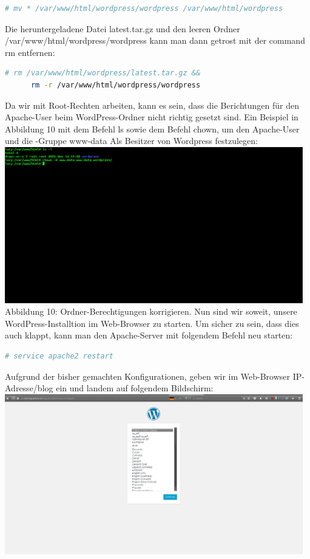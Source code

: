 \documentclass{article}
\begin{document}
	\begin{lstlisting}[language=bash]
	# mv * /var/www/html/wordpress/wordpress /var/www/html/wordpress
	\end{lstlisting}
	Die heruntergeladene Datei latest.tar.gz und den leeren Ordner /var/www/html/wordpress/wordpress kann man dann getrost mit der command rm entfernen:
	\begin{lstlisting}[language=bash]
	# rm /var/www/html/wordpress/latest.tar.gz &&
	  rm -r /var/www/html/wordpress/wordpress
	\end{lstlisting}
	Da wir mit Root-Rechten arbeiten, kann es sein, dass die Berichtungen für den Apache-User beim WordPress-Ordner nicht richtig gesetzt sind. Ein Beispiel in Abbildung 10 mit dem Befehl ls sowie dem Befehl chown, um den Apache-User und die -Gruppe www-data Als Besitzer von Wordpress festzulegen:
	\newline
	\newline
	\includegraphics[width=13cm]{../Pics/35-wordpress-permissions}
	Abbildung 10: Ordner-Berechtigungen korrigieren.
	\newline
	\newline
	Nun sind wir soweit, unsere WordPress-Installtion im Web-Browser zu starten. Um sicher zu sein, dass dies auch klappt, kann man den Apache-Server mit folgendem Befehl neu starten:
	\begin{lstlisting}[language=bash]
	# service apache2 restart
	\end{lstlisting}
	Aufgrund der bisher gemachten Konfigurationen, geben wir im Web-Browser IP-Adresse/blog ein und landem auf folgendem Bildschirm:
	\newline
	\newline
	\includegraphics[width=13cm]{../Pics/36-wordpress-konfbildschirm}
\end{document}
